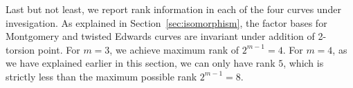 

Last but not least, we report rank information in each of the four
curves under invesigation.
%
As explained in Section~\ref{sec:isomorphism}, the factor bases for
Montgomery and twisted Edwards curves are invariant under addition of
2-torsion point.
%
For $m=3$, we achieve maximum rank of $2^{m-1}=4$.
%
For $m=4$, as we have explained earlier in this section, we can only
have rank $5$, which is strictly less than the maximum possible rank
$2^{m-1}=8$.




